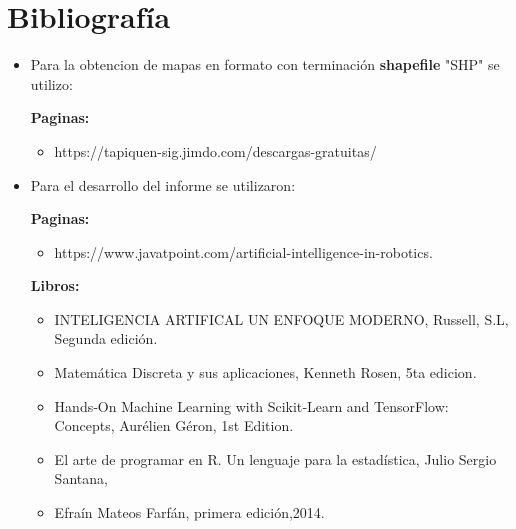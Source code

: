 \documentclass[a4paper]{article}
\begin{document}
\section{Bibliograf\'ia}
\begin{itemize}	
\item Para la obtencion de mapas en formato con terminaci\'on \textbf{shapefile} "SHP" se utilizo:

\textbf{Paginas:}
\begin{itemize}
\item https://tapiquen-sig.jimdo.com/descargas-gratuitas/
\end{itemize}

\item Para el desarrollo del informe se utilizaron:

\textbf{Paginas:}
\begin{itemize}
\item https://www.javatpoint.com/artificial-intelligence-in-robotics.
\end{itemize}

\textbf{Libros:}
\begin{itemize}
\item INTELIGENCIA ARTIFICAL UN ENFOQUE MODERNO, Russell, S.L, Segunda edición.
\item Matemática Discreta y sus aplicaciones, Kenneth Rosen, 5ta edicion.
\item Hands‑On Machine Learning with Scikit‑Learn and TensorFlow: Concepts, Aurélien Géron, 1st Edition.
\item El arte de programar en R. Un lenguaje para la estadística, Julio Sergio Santana, \item Efraín Mateos Farfán, primera edición,2014.
\end{itemize}
\end{itemize}
\end{document}

